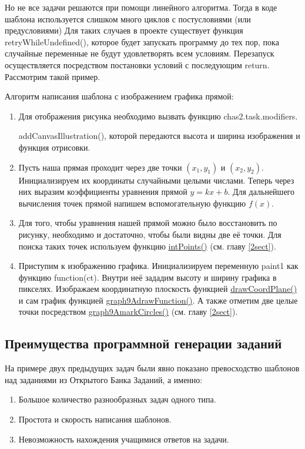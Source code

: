Но не все задачи решаются при помощи линейного алгоритма. Тогда в коде шаблона
используется слишком много циклов с постусловиями (или предусловиями)
Для таких случаев в проекте существует функция retryWhileUndefined(), которое
будет запускать программу до тех пор, пока случайные переменные не будут удовлетворять всем условиям.
Перезапуск осуществляется посредством постановки условий с последующим return.
Рассмотрим такой пример.

Алгоритм написания шаблона с изображением графика прямой:
\begin{enumerate}
    \item Для отображения рисунка необходимо вызвать функцию chas2.task.modifiers.

          addCanvasIllustration(), которой передаются высота и ширина изображения и функция отрисовки.
          
    \item Пусть наша прямая проходит через две точки $(x_1,y_1)$ и $(x_2,y_2)$. Инициализируем их координаты случайными целыми числами. Теперь через них выразим коэффициенты уравнения прямой $y=kx+b$.
          Для дальнейшего вычисления точек прямой напишем вспомогательную функцию $f(x)$.
          
    \item Для того, чтобы уравнения нашей прямой можно было восстановить по рисунку, необходимо и достаточно,
          чтобы были видны две её точки. Для поиска таких точек используем функцию \hyperlink{intPoints}{intPoints()} (см. главу \ref{2sect}).
          
    \item Приступим к изображению графика. Инициализируем переменную paint1 как функцию function(ct). Внутри неё зададим высоту и ширину графика в пикселях.
          Изображаем координатную плоскость функцией \hyperlink{drawCoordPlane}{drawCoordPlane()} и сам график функцией
          \hyperlink{graph9AdrawFunction}{graph9AdrawFunction()}. А также отметим две целые точки посредством \hyperlink{graph9AmarkCircles}{graph9AmarkCircles()} (см. главу \ref{2sect}).
          \vspace{\baselineskip}

          
\end{enumerate}
\subsection{Преимущества программной генерации заданий}
На примере двух предыдущих задач были явно показано превосходство шаблонов над заданиями из Открытого Банка Заданий, а именно:
\begin{enumerate}
    \item Большое количество разнообразных задач одного типа.
    \item Простота и скорость написания шаблонов.
    \item Невозможность нахождения учащимися ответов на задачи.
\end{enumerate}

